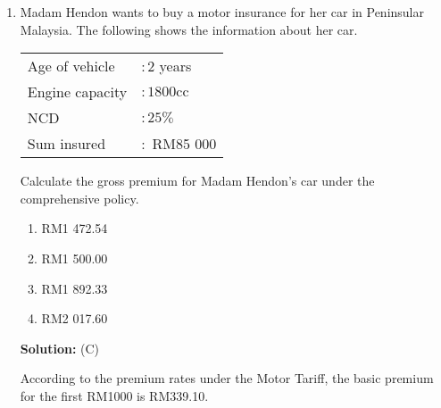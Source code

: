 \documentclass{report}
\newcommand{\sol}{

    \vspace{0.5em}\textbf{Solution:}\vspace{0.5em}}
\begin{document}
\begin{enumerate}
          Mr Raji who is 32 years old wants to get a coverage of RM95 000. What is the
          premium for Mr Raji's life insurance if he does not smoke?
          \begin{enumerate}[label=(\Alph*)]
              \item RM170.05
              \item RM207.58
              \item RM212.71
              \item RM237.22
          \end{enumerate}
          \sol{} (B)

          According to the table, the premium rate for a 32 years old male non-smoker is
          RM2.185 per RM1 000 face value. Hence, the premium for Mr Raji's life insurance
          is $\dfrac{95 000}{1000} \times 2.185 = \text{RM207.58}$. \vspace{0.5cm}

    \item Madam Hendon wants to buy a motor insurance for her car in Peninsular Malaysia.
          The following shows the information about her car.

          \begin{tabular}{|ll|}
              \hline Age of vehicle & $: 2$ years          \\
              Engine capacity       & $: 1800 \mathrm{cc}$ \\
              NCD                   & $: 25 \%$            \\
              Sum insured           & $:$ RM85 000         \\
              \hline
          \end{tabular}

          Calculate the gross premium for Madam Hendon's car under the comprehensive
          policy.
          \begin{enumerate}[label=(\Alph*)]
              \item RM1 472.54
              \item RM1 500.00
              \item RM1 892.33
              \item RM2 017.60
          \end{enumerate}

          \sol{} (C)

          According to the premium rates under the Motor Tariff, the basic premium for
          the first RM1000 is RM339.10.


\end{enumerate}
\end{document}
